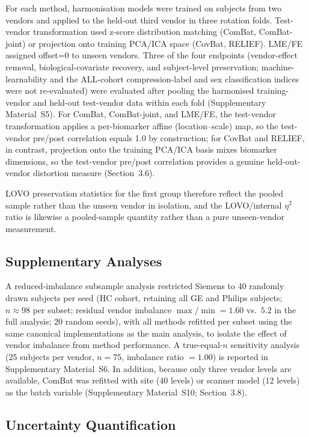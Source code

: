 \documentclass[12pt,a4paper]{article}
\begin{document}
For each method, harmonisation models were trained on subjects from two vendors and applied to the held-out third vendor in three rotation folds. Test-vendor transformation used z-score distribution matching (ComBat, ComBat-joint) or projection onto training PCA/ICA space (CovBat, RELIEF). LME/FE assigned offset=0 to unseen vendors. Three of the four endpoints (vendor-effect removal, biological-covariate recovery, and subject-level preservation; machine-learnability and the ALL-cohort compression-label and sex classification indices were not re-evaluated) were evaluated after pooling the harmonised training-vendor and held-out test-vendor data within each fold (Supplementary Material~S5). For ComBat, ComBat-joint, and LME/FE, the test-vendor transformation applies a per-biomarker affine (location--scale) map, so the test-vendor pre/post correlation equals 1.0 by construction; for CovBat and RELIEF, in contrast, projection onto the training PCA/ICA basis mixes biomarker dimensions, so the test-vendor pre/post correlation provides a genuine held-out-vendor distortion measure (Section~3.6).

LOVO preservation statistics for the first group therefore reflect the pooled sample rather than the unseen vendor in isolation, and the LOVO/internal $\eta^2$ ratio is likewise a pooled-sample quantity rather than a pure unseen-vendor measurement.

\subsection{Supplementary Analyses}

A reduced-imbalance subsample analysis restricted Siemens to 40 randomly drawn subjects per seed (HC cohort, retaining all GE and Philips subjects; $n\approx98$ per subset; residual vendor imbalance $\max/\min=1.60$ vs.\ $5.2$ in the full analysis; 20 random seeds), with all methods refitted per subset using the same canonical implementations as the main analysis, to isolate the effect of vendor imbalance from method performance. A true-equal-$n$ sensitivity analysis (25 subjects per vendor, $n=75$, imbalance ratio $=1.00$) is reported in Supplementary Material~S6. In addition, because only three vendor levels are available, ComBat was refitted with site (40 levels) or scanner model (12 levels) as the batch variable (Supplementary Material~S10; Section~3.8).

\subsection{Uncertainty Quantification}
\end{document}
